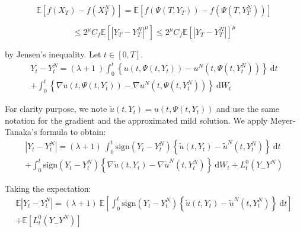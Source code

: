 \documentclass{article}[12pt]
\newcommand{\E}{\mathbb{E}}
\newcommand{\di}{\mathrm{d}}
\begin{document}
\begin{equation*}
\E\left[f\left(X_T\right)-f\left(X_T^N\right)\right] = \E\left[f\left(\Psi\left(T,Y_T\right)\right)-f\left(\Psi\left(T,Y_T^N\right)\right)\right]
\end{equation*}

\begin{equation*}
\leq 2^\mu C_f  \E\left[\left|Y_T-Y_T^N\right|^\mu\right] \leq 2^\mu C_f  \E\left[\left|Y_T-Y_T^N\right|\right]^\mu
\end{equation*}

by Jensen's inequality. Let $t\in[0,T]$.
\begin{multline*}
Y_t-Y_t^N = (\lambda + 1\ )\int_0^t\left\{u\left(t,\Psi\left(t,Y_t\right)\right)-u^N\left(t,\Psi\left(t,Y_t^N\right)\right)\right\}\ \di t\\ + \int_0^t\left\{\nabla u\left(t,\Psi\left(t,Y_t\right)\right)-\nabla u^N\left(t,\Psi\left(t,Y_t^N\right)\right)\right\}\ \di W_t
\end{multline*}

For clarity purpose, we note $\tilde{u}\left(t,Y_t\right) = u\left(t,\Psi\left(t,Y_t\right)\right)$ and use the same notation for the gradient and the approximated mild solution. We apply Meyer-Tanaka's formula to obtain:
\begin{multline*}
\left|Y_t-Y_t^N\right| = (\lambda + 1)\ \int_0^t\mathrm{sign}(Y_t-Y_t^N)\left\{\tilde{u}\left(t,Y_t\right)-\tilde{u}^N\left(t,Y_t^N\right)\right\}\ \di t\\ + \int_0^t\mathrm{sign}(Y_t-Y_t^N)\left\{\nabla\tilde{u}\left(t,Y_t\right)-\nabla\tilde{u}^N\left(t,Y_t^N\right)\right\}\ \di W_t + L_t^0(Y_-Y^N)
\end{multline*}

Taking the expectation:
\begin{multline*}
\E\left|Y_t-Y_t^N\right| = (\lambda + 1)\ \E\left[\int_0^t\mathrm{sign}(Y_t-Y_t^N)\left\{\tilde{u}\left(t,Y_t\right)-\tilde{u}^N\left(t,Y_t^N\right)\right\}\ \di t\right]\\ + \E \left[L_t^0(Y_-Y^N)\right]
\end{multline*}

       


    
\end{document}
